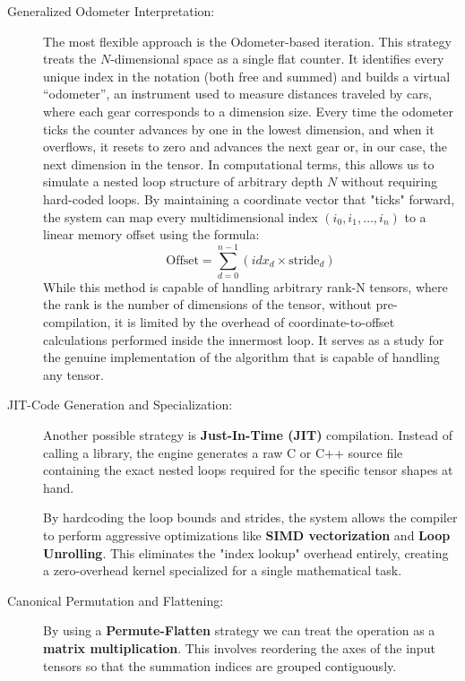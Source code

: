 \documentclass[binding=0.6cm]{sapthesis}
\begin{document}
\begin{description}
	\item [Generalized Odometer Interpretation:]
	      The most flexible approach is the Odometer-based iteration.
	      This strategy treats the $N$-dimensional space as a single flat counter.
	      It identifies every unique index in the notation (both free and summed) and builds a virtual ``odometer'',
	      an instrument used to measure distances traveled by cars, where each gear corresponds to a dimension size. Every time the odometer ticks the counter advances by one in the lowest dimension, and when it overflows, it resets to zero and advances the next gear or, in our case, the next dimension in the tensor.
	      In computational terms, this allows us to simulate a nested loop structure of arbitrary depth $N$ without requiring hard-coded loops. By maintaining a coordinate vector that "ticks" forward, the system can map every multidimensional index $(i_0, i_1, \dots, i_n)$ to a linear memory offset using the formula:
	      \begin{equation}
		      \text{Offset} = \sum_{d=0}^{n-1} \left( idx_d \times \text{stride}_d \right)
	      \end{equation}
	      While this method is capable of handling arbitrary rank-N tensors, where the rank is the number of dimensions of the tensor, without pre-compilation, it is limited by the overhead of coordinate-to-offset calculations performed inside the innermost loop. It serves as a study for the genuine implementation of the algorithm that is capable of handling any tensor.

	\item [JIT-Code Generation and Specialization:]
	      Another possible strategy is \textbf{Just-In-Time (JIT)} compilation. Instead of calling a library, the engine generates a raw C or C++ source file containing the exact nested loops required for the specific tensor shapes at hand.

	      By hardcoding the loop bounds and strides, the system allows the compiler to perform aggressive optimizations like \textbf{SIMD vectorization} and \textbf{Loop Unrolling}. This eliminates the "index lookup" overhead entirely, creating a zero-overhead kernel specialized for a single mathematical task.
	\item [Canonical Permutation and Flattening:]
	      By using a \textbf{Permute-Flatten} strategy we can treat the operation as a \textbf{matrix multiplication}. This involves reordering the axes of the input tensors so that the summation indices are grouped contiguously.


\end{description}
\end{document}
